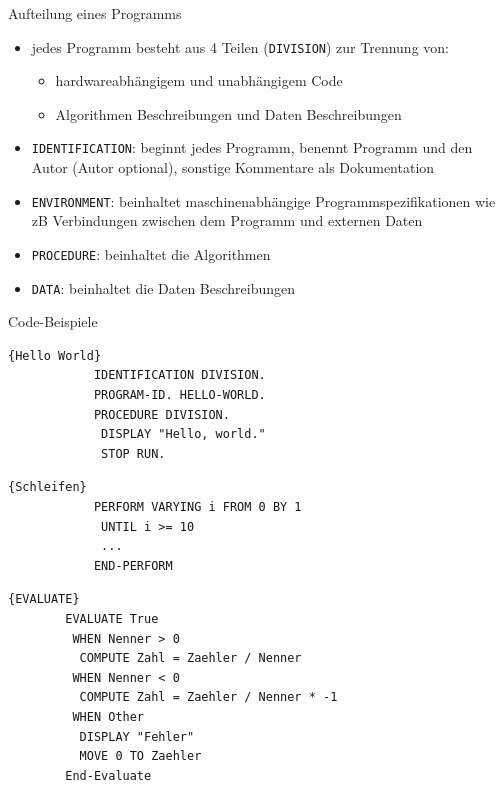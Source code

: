 \documentclass[handout]{beamer}
\begin{document}
\begin{frame}{Aufteilung eines Programms}
	\begin{itemize}[<+->]
		\item
			jedes Programm besteht aus 4 Teilen (\texttt{DIVISION}) zur Trennung von:
			\begin{itemize}[<+->]
			 	\item hardwareabh\"angigem und unabh\"angigem Code
				\item Algorithmen Beschreibungen und Daten Beschreibungen
			 \end{itemize}
		\item
			\texttt{IDENTIFICATION}: beginnt jedes Programm, benennt Programm und den Autor (Autor optional), sonstige Kommentare als Dokumentation
		\item
			\texttt{ENVIRONMENT}: beinhaltet maschinenabhängige Programmspezifikationen wie zB Verbindungen zwischen dem Programm und externen Daten
		\item
			\texttt{PROCEDURE}: beinhaltet die Algorithmen
		\item
			\texttt{DATA}: beinhaltet die Daten Beschreibungen
	\end{itemize}
\end{frame}

\def\beamertemplatetransparentcoveredmedium{}
\beamertemplatetransparentcoveredmedium
\begin{frame}[fragile]{Code-Beispiele}
	\onslide<1-1>
	\noindent\begin{minipage}{.44\textwidth}
		\begin{lstlisting}{Hello World}
			IDENTIFICATION DIVISION.
			PROGRAM-ID. HELLO-WORLD.
			PROCEDURE DIVISION.
			 DISPLAY "Hello, world."
			 STOP RUN.
		\end{lstlisting}
	\end{minipage}\hfill\pause
	\noindent\begin{minipage}{.53\textwidth}
		\begin{lstlisting}{Schleifen}
			PERFORM VARYING i FROM 0 BY 1
			 UNTIL i >= 10
			 ...
			END-PERFORM
		\end{lstlisting}
	\end{minipage}\pause
	\lstset{numbers=left,firstnumber=1}
	\begin{lstlisting}{EVALUATE}
		EVALUATE True
		 WHEN Nenner > 0
		  COMPUTE Zahl = Zaehler / Nenner
		 WHEN Nenner < 0
		  COMPUTE Zahl = Zaehler / Nenner * -1
		 WHEN Other
		  DISPLAY "Fehler"
		  MOVE 0 TO Zaehler
		End-Evaluate
	\end{lstlisting}
\end{frame}
\end{document}
